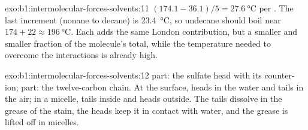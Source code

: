 \begin{solution}{exo:b1:intermolecular-forces-solvents:11}
$(174.1 - 36.1)/5 = \qty{27.6}{\celsius}$ per . The last
increment (nonane to decane) is \qty{23.4}{\celsius}, so undecane should
boil near $174 + 22 \approx \qty{196}{\celsius}$. Each  adds the
same London contribution, but a smaller and smaller fraction of the
molecule's total, while the temperature needed to overcome the
interactions is already high.
\end{solution}

\begin{solution}{exo:b1:intermolecular-forces-solvents:12}
 part: the sulfate head  with its  counter-ion;
 part: the twelve-carbon chain. At the surface, heads in the
water and tails in the air; in a micelle, tails inside and heads outside.
The tails dissolve in the grease of the stain, the heads keep it in
contact with water, and the grease is lifted off in micelles.
\end{solution}

